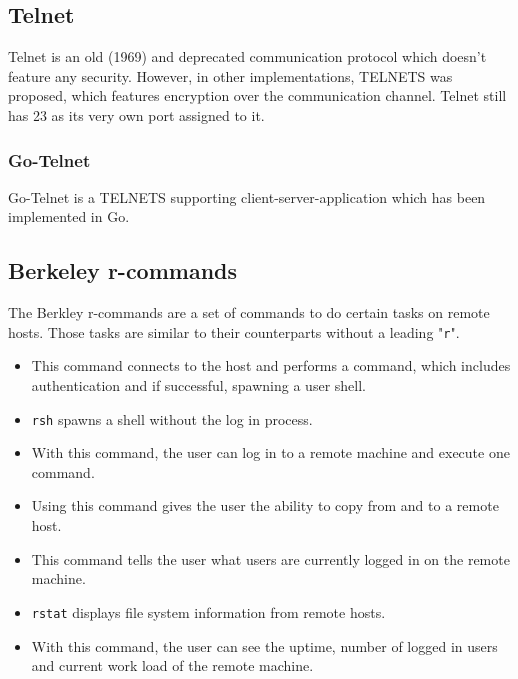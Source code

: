 \documentclass[10pt,a4paper,titlepage,twoside,english,final]{zhawreprt}
\begin{document}
\subsection{Telnet}\label{ssec:Telnet}
Telnet\citep{rfc15,rfc854} is an old (1969) and deprecated communication protocol which doesn't feature any security. However, in other implementations, \gls{TELNETS} was proposed, which features encryption over the communication channel.
Telnet still has 23 as its very own \gls{port} assigned to it.
\subsubsection{Go-Telnet}
Go-Telnet\citep{gotelnet} is a \gls{TELNETS} supporting client-server-application which has been implemented in \gls{Go}.

\subsection{Berkeley r-commands}\label{ssec:BerkeleyRCommands}
The Berkley r-commands are a set of commands to do certain tasks on remote hosts. Those tasks are similar to their counterparts without a leading "\texttt{r}".
\begin{itemize}
\item \cite{rlogin}

This command connects to the host and performs a \cite{login} command, which includes authentication and if successful, spawning a user \gls{shell}.
\item \cite{rsh}

\texttt{rsh} spawns a \gls{shell} without the log in process.
\item \cite{rexec}

With this command, the user can log in to a remote machine and execute one command.
\item \cite{rcp}

Using this command gives the user the ability to copy from and to a remote host.
\item \cite{rwho}

This command tells the user what users are currently logged in on the remote machine.
\item \cite{rstat}

\texttt{rstat} displays file system information from remote hosts.
\item \cite{ruptime}

With this command, the user can see the uptime, number of logged in users and current work load of the remote machine.
\end{itemize}
\end{document}
